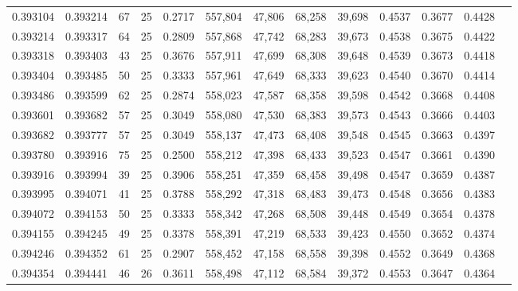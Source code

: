 \begin{tabular}{rrrrrrrrrrrrr}
0.393104 & 0.393214 &    67 &  25 &                                     0.2717 & 557,804 &  47,806 &  68,258 &  39,698 & 0.4537 & 0.3677 & 0.4428 \\
0.393214 & 0.393317 &    64 &  25 &                                     0.2809 & 557,868 &  47,742 &  68,283 &  39,673 & 0.4538 & 0.3675 & 0.4422 \\
0.393318 & 0.393403 &    43 &  25 &                                     0.3676 & 557,911 &  47,699 &  68,308 &  39,648 & 0.4539 & 0.3673 & 0.4418 \\
0.393404 & 0.393485 &    50 &  25 &                                     0.3333 & 557,961 &  47,649 &  68,333 &  39,623 & 0.4540 & 0.3670 & 0.4414 \\
0.393486 & 0.393599 &    62 &  25 &                                     0.2874 & 558,023 &  47,587 &  68,358 &  39,598 & 0.4542 & 0.3668 & 0.4408 \\
0.393601 & 0.393682 &    57 &  25 &                                     0.3049 & 558,080 &  47,530 &  68,383 &  39,573 & 0.4543 & 0.3666 & 0.4403 \\
0.393682 & 0.393777 &    57 &  25 &                                     0.3049 & 558,137 &  47,473 &  68,408 &  39,548 & 0.4545 & 0.3663 & 0.4397 \\
0.393780 & 0.393916 &    75 &  25 &                                     0.2500 & 558,212 &  47,398 &  68,433 &  39,523 & 0.4547 & 0.3661 & 0.4390 \\
0.393916 & 0.393994 &    39 &  25 &                                     0.3906 & 558,251 &  47,359 &  68,458 &  39,498 & 0.4547 & 0.3659 & 0.4387 \\
0.393995 & 0.394071 &    41 &  25 &                                     0.3788 & 558,292 &  47,318 &  68,483 &  39,473 & 0.4548 & 0.3656 & 0.4383 \\
0.394072 & 0.394153 &    50 &  25 &                                     0.3333 & 558,342 &  47,268 &  68,508 &  39,448 & 0.4549 & 0.3654 & 0.4378 \\
0.394155 & 0.394245 &    49 &  25 &                                     0.3378 & 558,391 &  47,219 &  68,533 &  39,423 & 0.4550 & 0.3652 & 0.4374 \\
0.394246 & 0.394352 &    61 &  25 &                                     0.2907 & 558,452 &  47,158 &  68,558 &  39,398 & 0.4552 & 0.3649 & 0.4368 \\
0.394354 & 0.394441 &    46 &  26 &                                     0.3611 & 558,498 &  47,112 &  68,584 &  39,372 & 0.4553 & 0.3647 & 0.4364 \\

\end{tabular}
